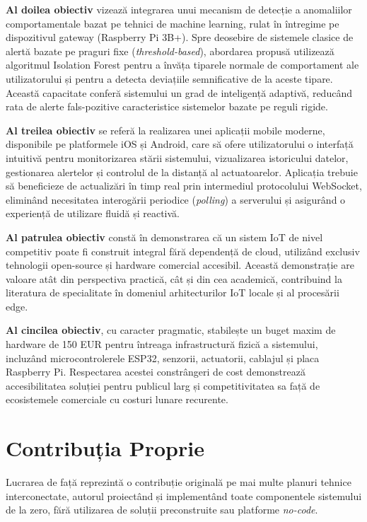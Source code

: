 \documentclass[12pt, twoside, a4paper]{report}
\begin{document}
\textbf{Al doilea obiectiv} vizează integrarea unui mecanism de detecție a anomaliilor
comportamentale bazat pe tehnici de machine learning, rulat în întregime pe dispozitivul
gateway (Raspberry Pi 3B+). Spre deosebire de sistemele clasice de alertă bazate pe
praguri fixe (\textit{threshold-based}), abordarea propusă utilizează algoritmul
Isolation Forest \cite{liu2008} pentru a învăța tiparele normale de comportament ale
utilizatorului și pentru a detecta deviațiile semnificative de la aceste tipare. Această
capacitate conferă sistemului un grad de inteligență adaptivă, reducând rata de alerte
fals-pozitive caracteristice sistemelor bazate pe reguli rigide.

\textbf{Al treilea obiectiv} se referă la realizarea unei aplicații mobile moderne,
disponibile pe platformele iOS și Android, care să ofere utilizatorului o interfață
intuitivă pentru monitorizarea stării sistemului, vizualizarea istoricului datelor,
gestionarea alertelor și controlul de la distanță al actuatoarelor. Aplicația trebuie
să beneficieze de actualizări în timp real prin intermediul protocolului WebSocket,
eliminând necesitatea interogării periodice (\textit{polling}) a serverului și asigurând
o experiență de utilizare fluidă și reactivă.

\textbf{Al patrulea obiectiv} constă în demonstrarea că un sistem IoT de nivel
competitiv poate fi construit integral fără dependență de cloud, utilizând exclusiv
tehnologii open-source și hardware comercial accesibil. Această demonstrație are valoare
atât din perspectiva practică, cât și din cea academică, contribuind la literatura de
specialitate în domeniul arhitecturilor IoT locale și al procesării edge.

\textbf{Al cincilea obiectiv}, cu caracter pragmatic, stabilește un buget maxim de
hardware de 150 EUR pentru întreaga infrastructură fizică a sistemului, incluzând
microcontrolerele ESP32, senzorii, actuatorii, cablajul și placa Raspberry Pi.
Respectarea acestei constrângeri de cost demonstrează accesibilitatea soluției pentru
publicul larg și competitivitatea sa față de ecosistemele comerciale cu costuri lunare
recurente.

\section{Contribuția Proprie}

Lucrarea de față reprezintă o contribuție originală pe mai multe planuri tehnice
interconectate, autorul proiectând și implementând toate componentele sistemului de la
zero, fără utilizarea de soluții preconstruite sau platforme \textit{no-code}.
\end{document}
